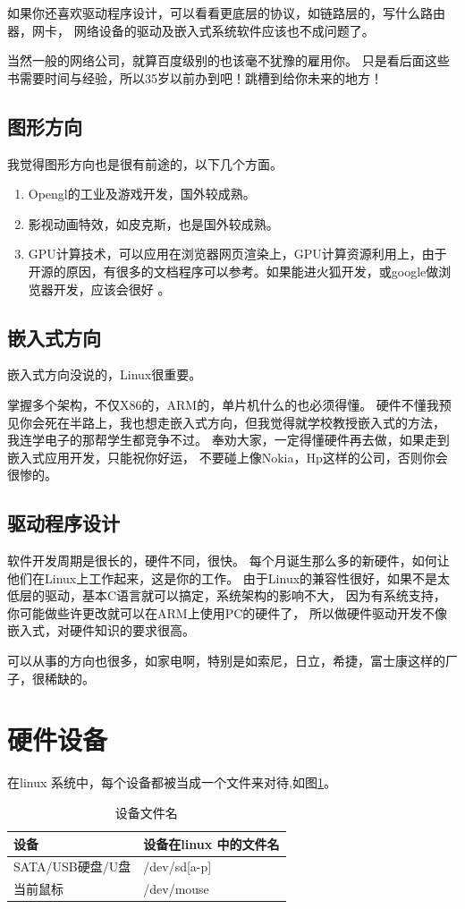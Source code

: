 \documentclass[UTF8,a4paper,12pt]{ctexbook}
\begin{document}
			如果你还喜欢驱动程序设计，可以看看更底层的协议，如链路层的，写什么路由器，网卡， 网络设备的驱动及嵌入式系统软件应该也不成问题了。
			
			当然一般的网络公司，就算百度级别的也该毫不犹豫的雇用你。 只是看后面这些书需要时间与经验，所以35岁以前办到吧！跳槽到给你未来的地方！
			
		\subsection{图形方向}我觉得图形方向也是很有前途的，以下几个方面。
			\begin{enumerate}
				\item Opengl的工业及游戏开发，国外较成熟。
				\item 影视动画特效，如皮克斯，也是国外较成熟。
				\item GPU计算技术，可以应用在浏览器网页渲染上，GPU计算资源利用上，由于开源的原因，有很多的文档程序可以参考。如果能进火狐开发，或google做浏览器开发，应该会很好 。
			\end{enumerate}
			
		\subsection{嵌入式方向}嵌入式方向没说的，Linux很重要。
			
			掌握多个架构，不仅X86的，ARM的，单片机什么的也必须得懂。 硬件不懂我预见你会死在半路上，我也想走嵌入式方向，但我觉得就学校教授嵌入式的方法， 我连学电子的那帮学生都竞争不过。 奉劝大家，一定得懂硬件再去做，如果走到嵌入式应用开发，只能祝你好运， 不要碰上像Nokia，Hp这样的公司，否则你会很惨的。
			
		\subsection{驱动程序设计}	
			软件开发周期是很长的，硬件不同，很快。 每个月诞生那么多的新硬件，如何让他们在Linux上工作起来，这是你的工作。 由于Linux的兼容性很好，如果不是太低层的驱动，基本C语言就可以搞定，系统架构的影响不大， 因为有系统支持，你可能做些许更改就可以在ARM上使用PC的硬件了， 所以做硬件驱动开发不像嵌入式，对硬件知识的要求很高。
			
			可以从事的方向也很多，如家电啊，特别是如索尼，日立，希捷，富士康这样的厂子，很稀缺的。
		
	\section{硬件设备}
			在linux 系统中，每个设备都被当成一个文件来对待,如图\ref{Name_linux}。
			\begin{table}[H]
				\centering
				\begin{tabular}{p{8cm}<{\centering}|p{5cm}<{\centering}}
					\toprule[1.5pt]
						设备 &  设备在linux 中的文件名 \\
					\midrule
						SATA/USB硬盘/U盘 &  /dev/sd[a-p] \\
						当前鼠标 &  /dev/mouse \\
					\bottomrule[1.5pt]
				\end{tabular}
				\caption{设备文件名}
				\label{Name_linux}
			\end{table}
\end{document}
